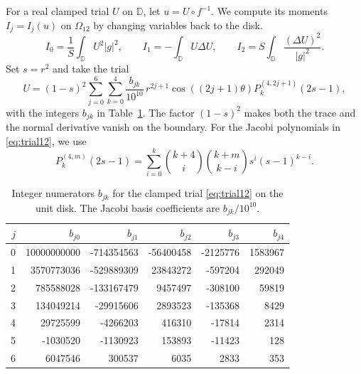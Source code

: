 \documentclass[a4paper,11pt]{amsart}
\numberwithin{equation}{section}
\theoremstyle{plain}
\theoremstyle{definition}
\newcommand{\D}{\mathbb D}
\begin{document}
For a real clamped trial \(U\) on \(\D\), let \(u=U\circ f^{-1}\).
We compute its moments \(I_j=I_j(u)\) on \(\Omega_{12}\) by changing
variables back to the disk.
\begin{equation}\label{eq:conformal-forms}
 I_0=\frac1S\int_\D U^2|g|^2,\qquad
 I_1=-\int_\D U\Delta U,\qquad
 I_2=S\int_\D\frac{(\Delta U)^2}{|g|^2}.
\end{equation}
Set \(s=r^2\) and take the trial
\begin{equation}\label{eq:trial12}
 U=(1-s)^2\sum_{j=0}^{6}\sum_{k=0}^{4}
       \frac{b_{jk}}{10^{10}}\,
       r^{2j+1}\cos((2j+1)\theta)
       P_k^{(4,2j+1)}(2s-1),
\end{equation}
with the integers \(b_{jk}\) in Table~\ref{tab:trial}.
The factor \((1-s)^2\) makes both the trace and the normal
derivative vanish on the boundary. For the Jacobi polynomials in
\eqref{eq:trial12}, we use
\[
 P_k^{(4,m)}(2s-1)
 =\sum_{i=0}^k
 \binom{k+4}{i}\binom{k+m}{k-i}s^i(s-1)^{k-i}.
\]

\begin{table}[!ht]
\centering\small
\caption{Integer numerators \(b_{jk}\) for the clamped trial
\eqref{eq:trial12} on the unit disk. The Jacobi basis coefficients
are \(b_{jk}/10^{10}\).}\label{tab:trial}
\begin{tabular}{r r r r r r}
\toprule
$j$&$b_{j0}$&$b_{j1}$&$b_{j2}$&$b_{j3}$&$b_{j4}$\\
\midrule
0&10000000000&-714354563&-56400458&-2125776&1583967\\
1&3570773036&-529889309&23843272&-597204&292049\\
2&785588028&-133167479&9457497&-308100&59819\\
3&134049214&-29915606&2893523&-135368&8429\\
4&29725599&-4266203&416310&-17814&2314\\
5&-1030520&-1130923&153893&-11423&128\\
6&6047546&300537&6035&2833&353\\
\bottomrule
\end{tabular}
\end{table}
\end{document}
